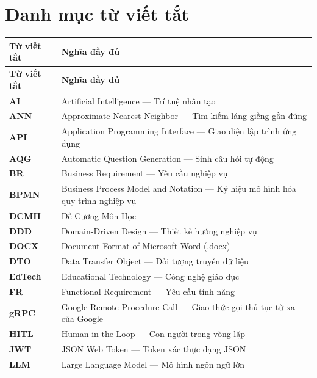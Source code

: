 \section*{Danh mục từ viết tắt}

\begin{longtable}{p{3.5cm}p{11cm}}
    \toprule
    \textbf{Từ viết tắt} & \textbf{Nghĩa đầy đủ} \\
    \midrule
    \endfirsthead
    \toprule
    \textbf{Từ viết tắt} & \textbf{Nghĩa đầy đủ} \\
    \midrule
    \endhead

    \textbf{AI}     & Artificial Intelligence --- Trí tuệ nhân tạo \\[3pt]
    \textbf{ANN}    & Approximate Nearest Neighbor --- Tìm kiếm láng giềng gần đúng \\[3pt]
    \textbf{API}    & Application Programming Interface --- Giao diện lập trình ứng dụng \\[3pt]
    \textbf{AQG}    & Automatic Question Generation --- Sinh câu hỏi tự động \\[3pt]
    \textbf{BR}     & Business Requirement --- Yêu cầu nghiệp vụ \\[3pt]
    \textbf{BPMN}   & Business Process Model and Notation --- Ký hiệu mô hình hóa quy trình nghiệp vụ \\[3pt]
    \textbf{DCMH}   & Đề Cương Môn Học \\[3pt]
    \textbf{DDD}    & Domain-Driven Design --- Thiết kế hướng nghiệp vụ \\[3pt]
    \textbf{DOCX}   & Document Format of Microsoft Word (.docx) \\[3pt]
    \textbf{DTO}    & Data Transfer Object --- Đối tượng truyền dữ liệu \\[3pt]
    \textbf{EdTech} & Educational Technology --- Công nghệ giáo dục \\[3pt]
    \textbf{FR}     & Functional Requirement --- Yêu cầu tính năng \\[3pt]
    \textbf{gRPC}   & Google Remote Procedure Call --- Giao thức gọi thủ tục từ xa của Google \\[3pt]
    \textbf{HITL}   & Human-in-the-Loop --- Con người trong vòng lặp \\[3pt]
    \textbf{JWT}    & JSON Web Token --- Token xác thực dạng JSON \\[3pt]
    \textbf{LLM}    & Large Language Model --- Mô hình ngôn ngữ lớn \\[3pt]

\end{longtable}
